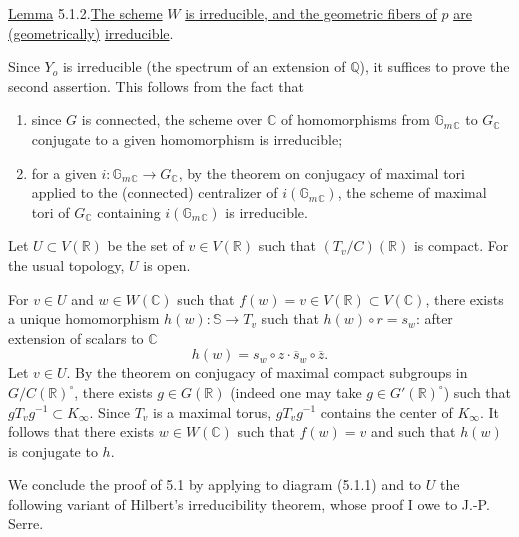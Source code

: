 \documentclass[10pt]{article}
\newcommand{\C}{\mathbb C}
\newcommand{\Gm}{\mathbb G_m}
\newcommand{\Q}{\mathbb Q}
\newcommand{\R}{\mathbb R}
\newcommand{\bS}{\mathbb S}
\begin{document}
\noindent \uline{Lemma} 5.1.2.\quad \uline{The scheme} $W$ \uline{is irreducible, and the geometric fibers of} $p$ \uline{are} \uline{(geometrically)} \uline{irreducible}.

Since $Y_o$ is irreducible (the spectrum of an extension of $\Q$), it suffices to prove the second assertion. This follows from the fact that
\begin{enumerate}[label=(\alph*)]
\item since $G$ is connected, the scheme over $\C$ of homomorphisms from $\Gm{}_{\C}$ to $G_{\C}$ conjugate to a given homomorphism is irreducible;
\item for a given $i:\Gm{}_{\C}\to G_{\C}$, by the theorem on conjugacy of maximal tori applied to the (connected) centralizer of $i(\Gm{}_{\C})$, the scheme of maximal tori of $G_{\C}$ containing $i(\Gm{}_{\C})$ is irreducible.
\end{enumerate}

Let $U\subset V(\R)$ be the set of $v\in V(\R)$ such that $(T_v/C)(\R)$ is compact. For the usual topology, $U$ is open.

For $v\in U$ and $w\in W(\C)$ such that $f(w)=v\in V(\R)\subset V(\C)$, there exists a unique homomorphism $h(w):\bS\longrightarrow T_v$ such that $h(w)\circ r=s_w$: after extension of scalars to $\C$
\[
h(w)=s_w\circ z\cdot \overline{s}_w\circ\overline z.
\]
Let $v\in U$. By the theorem on conjugacy of maximal compact subgroups in $G/C(\R)^\circ$, there exists $g\in G(\R)$ (indeed one may take $g\in G'(\R)^\circ$) such that $gT_vg^{-1}\subset K_\infty$.
Since $T_v$ is a maximal torus, $gT_vg^{-1}$ contains the center of $K_\infty$. It follows that there exists $w\in W(\C)$ such that $f(w)=v$ and such that $h(w)$ is conjugate to $h$.

We conclude the proof of 5.1 by applying to diagram (5.1.1) and to $U$ the following variant of Hilbert's irreducibility theorem, whose proof I owe to J.-P. Serre.
\end{document}
